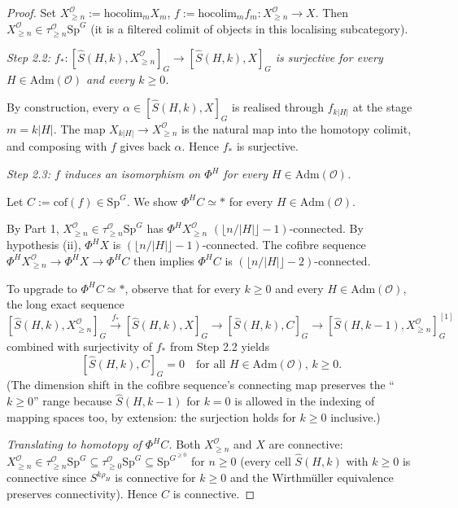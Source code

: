 \documentclass[12pt]{article}
\theoremstyle{definition}
\newcommand{\SpG}{\mathrm{Sp}^{G}}
\newcommand{\PhiH}{\Phi^{H}}
\newcommand{\OO}{\mathcal{O}}
\newcommand{\admis}{\mathrm{Adm}}
\begin{document}
\begin{proof}
Set $X^{\OO}_{\geq n}:=\mathrm{hocolim}_{m}X_{m}$, $f:=\mathrm{hocolim}_{m}f_{m}\colon
X^{\OO}_{\geq n}\to X$. Then $X^{\OO}_{\geq n}\in\tau_{\geq n}^{\OO}\SpG$ (it is a
filtered colimit of objects in this localising subcategory).

\smallskip
\noindent\emph{Step 2.2: $f_{*}\colon[\widehat{S}(H,k),X^{\OO}_{\geq n}]_{G}\to
[\widehat{S}(H,k),X]_{G}$ is surjective for every $H\in\admis(\OO)$ and
every $k\geq 0$.}

By construction, every $\alpha\in[\widehat{S}(H,k),X]_{G}$ is realised
through $f_{k|H|}$ at the stage $m=k|H|$. The map
$X_{k|H|}\to X^{\OO}_{\geq n}$ is the natural map into the homotopy colimit, and
composing with $f$ gives back $\alpha$. Hence $f_{*}$ is surjective.

\smallskip
\noindent\emph{Step 2.3: $f$ induces an isomorphism on $\PhiH$ for every
$H\in\admis(\OO)$.}

Let $C:=\mathrm{cof}(f)\in\SpG$. We show $\PhiH C\simeq\ast$ for every
$H\in\admis(\OO)$.

By Part 1, $X^{\OO}_{\geq n}\in\tau_{\geq n}^{\OO}\SpG$ has $\PhiH X^{\OO}_{\geq n}$
$(\lfloor n/|H|\rfloor-1)$-connected. By hypothesis (ii), $\PhiH X$ is
$(\lfloor n/|H|\rfloor-1)$-connected. The cofibre sequence
$\PhiH X^{\OO}_{\geq n}\to\PhiH X\to\PhiH C$ then implies $\PhiH C$ is
$(\lfloor n/|H|\rfloor-2)$-connected.

To upgrade to $\PhiH C\simeq\ast$, observe that for every $k\geq 0$ and every
$H\in\admis(\OO)$, the long exact sequence
\[
[\widehat{S}(H,k),X^{\OO}_{\geq n}]_{G}\xrightarrow{f_{*}}[\widehat{S}(H,k),X]_{G}
\to[\widehat{S}(H,k),C]_{G}\to[\widehat{S}(H,k-1),X^{\OO}_{\geq n}]_{G}^{[1]}
\]
combined with surjectivity of $f_{*}$ from Step 2.2 yields
\[
[\widehat{S}(H,k),C]_{G}=0\quad\text{for all }H\in\admis(\OO),\,k\geq 0.
\]
(The dimension shift in the cofibre sequence's connecting map preserves the
``$k\geq 0$'' range because $\widehat{S}(H,k-1)$ for $k=0$ is allowed in the
indexing of mapping spaces too, by extension: the surjection holds for
$k\geq 0$ inclusive.)

\smallskip
\noindent\emph{Translating to homotopy of $\PhiH C$.} Both $X^{\OO}_{\geq n}$
and $X$ are connective: $X^{\OO}_{\geq n}\in\tau_{\geq n}^{\OO}\SpG\subseteq
\tau_{\geq 0}^{\OO}\SpG\subseteq\SpG^{\geq 0}$ for $n\geq 0$ (every cell
$\widehat{S}(H,k)$ with $k\geq 0$ is connective since $S^{k\rho_{H}}$ is
connective for $k\geq 0$ and the Wirthmüller equivalence preserves
connectivity). Hence $C$ is connective.


\end{proof}
\end{document}

